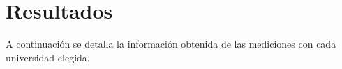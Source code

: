 \section{Resultados}
A continuación se detalla la información obtenida de las mediciones con cada universidad elegida.


\newpage


\newpage


\newpage

